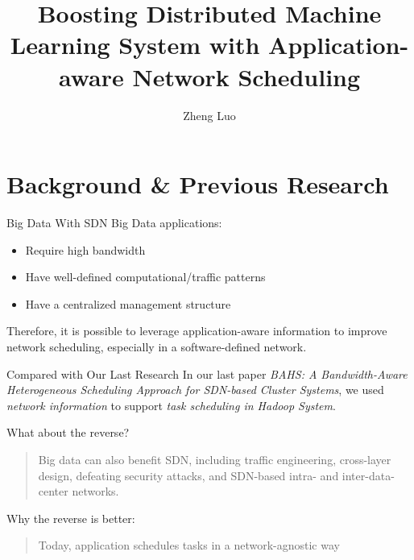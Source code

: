 \documentclass{beamer}
\title{Boosting Distributed Machine Learning System with Application-aware Network Scheduling}
\author{Zheng Luo}
\begin{document}
\begin{frame}
  \titlepage
\end{frame}

\section{Background \& Previous Research}
\begin{frame}{Big Data With SDN}
    Big Data applications\footnotemark:
    \begin{itemize}
        \item Require high bandwidth
        \item Have well-defined computational/traffic patterns
        \item Have a centralized management structure
    \end{itemize}
    
    Therefore, it is possible to leverage application-aware information to improve network scheduling, especially in a software-defined network.
    
\end{frame}

\begin{frame}{Compared with Our Last Research}
In our last paper \small{\emph{BAHS: A Bandwidth-Aware Heterogeneous Scheduling Approach for SDN-based Cluster Systems}}, we used \emph{network information} to support \emph{task scheduling in Hadoop System}.

What about the reverse?

\begin{quotation}
Big data can also benefit SDN, including traffic engineering, cross-layer design, defeating security attacks, and SDN-based intra- and inter-data-center networks.\footnotemark[1]
\end{quotation}

Why the reverse is better:
\begin{quotation}
Today, application schedules tasks in a network-agnostic way\footnotemark[2]
\end{quotation}

\end{frame}
\end{document}
